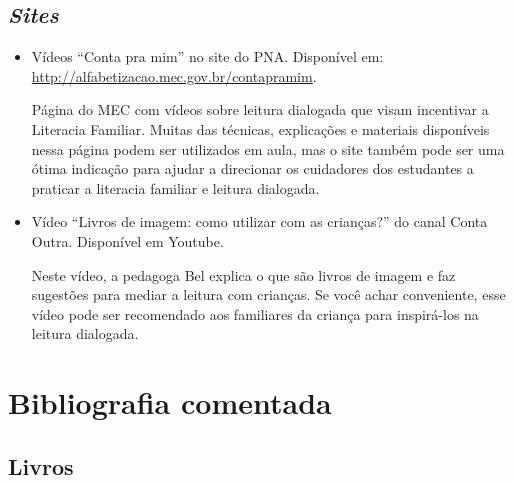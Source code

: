 \documentclass[11pt]{extarticle}
\begin{document}
\subsection{\textit{Sites}}

\begin{itemize}
\item Vídeos “Conta pra mim” no site do PNA. Disponível em: \url{http://alfabetizacao.mec.gov.br/contapramim}. 

Página do MEC com vídeos sobre leitura dialogada que visam incentivar a Literacia Familiar. Muitas das 
técnicas, explicações e materiais disponíveis nessa página podem ser utilizados em aula, mas o site também 
pode ser uma ótima indicação para ajudar a direcionar os cuidadores dos estudantes a praticar 
a literacia familiar e leitura dialogada.

\item Vídeo “Livros de imagem: como utilizar com as crianças?” do canal Conta Outra. Disponível em Youtube. 

Neste vídeo, a pedagoga Bel explica o que são livros de imagem e faz sugestões para mediar a leitura com 
crianças. Se você achar conveniente, esse vídeo pode ser recomendado aos familiares da criança 
para inspirá-los na leitura dialogada. 

\end{itemize}

\section{Bibliografia comentada}

\subsection{Livros}
\end{document}
